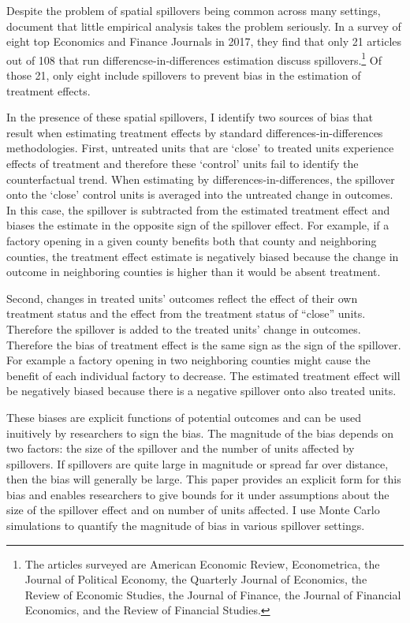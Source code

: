 \documentclass[11pt]{article}
\begin{document}
Despite the problem of spatial spillovers being common across many settings, \citet{Berg_Streitz_2019} document that little empirical analysis takes the problem seriously. In a survey of eight top Economics and Finance Journals in 2017, they find that only 21 articles out of 108 that run differencse-in-differences estimation discuss spillovers.\footnote{The articles surveyed are American Economic Review, Econometrica, the Journal of Political Economy, the Quarterly Journal of Economics, the Review of Economic Studies, the Journal of Finance, the Journal of Financial Economics, and the Review of Financial Studies.} Of those 21, only eight include spillovers to prevent bias in the estimation of treatment effects.

In the presence of these spatial spillovers, I identify two sources of bias that result when estimating treatment effects by standard differences-in-differences methodologies. First, untreated units that are `close' to treated units experience effects of treatment and therefore these `control' units fail to identify the counterfactual trend. When estimating by differences-in-differences, the spillover onto the `close' control units is averaged into the untreated change in outcomes. In this case, the spillover is subtracted from the estimated treatment effect and biases the estimate in the opposite sign of the spillover effect. For example, if a factory opening in a given county benefits both that county and neighboring counties, the treatment effect estimate is negatively biased because the change in outcome in neighboring counties is higher than it would be absent treatment. 

Second, changes in treated units' outcomes reflect the effect of their own treatment status and the effect from the treatment status of ``close'' units. Therefore the spillover is added to the treated units' change in outcomes. Therefore the bias of treatment effect is the same sign as the sign of the spillover. For example a factory opening in two neighboring counties might cause the benefit of each individual factory to decrease. The estimated treatment effect will be negatively biased because there is a negative spillover onto also treated units. 

These biases are explicit functions of potential outcomes and can be used inuitively by researchers to sign the bias. The magnitude of the bias depends on two factors: the size of the spillover and the number of units affected by spillovers. If spillovers are quite large in magnitude or spread far over distance, then the bias will generally be large. This paper provides an explicit form for this bias and enables researchers to give bounds for it under assumptions about the size of the spillover effect and on number of units affected. I use Monte Carlo simulations to quantify the magnitude of bias in various spillover settings.
\end{document}
